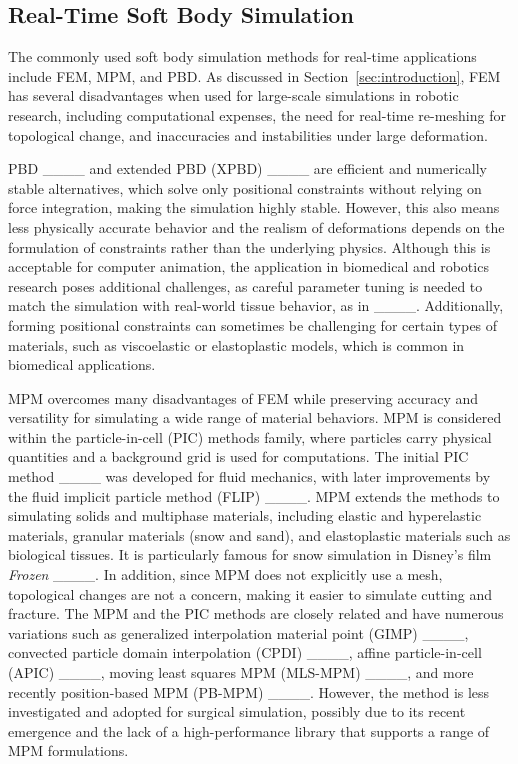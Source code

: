 \subsection{Real-Time Soft Body Simulation}
The commonly used soft body simulation methods for real-time applications include FEM, MPM, and PBD.
As discussed in Section~\ref{sec:introduction}, FEM has several disadvantages when used for large-scale simulations in robotic research, including computational expenses, the need for real-time re-meshing for topological change, and inaccuracies and instabilities under large deformation.

PBD ____ and extended PBD (XPBD) ____ are efficient and numerically stable alternatives, which solve only positional constraints without relying on force integration, making the simulation highly stable.
However, this also means less physically accurate behavior and the realism of deformations depends on the formulation of constraints rather than the underlying physics.
Although this is acceptable for computer animation, the application in biomedical and robotics research poses additional challenges, as careful parameter tuning is needed to match the simulation with real-world tissue behavior, as in ____.
Additionally, forming positional constraints can sometimes be challenging for certain types of materials, such as viscoelastic or elastoplastic models, which is common in biomedical applications.

MPM overcomes many disadvantages of FEM while preserving accuracy and versatility for simulating a wide range of material behaviors.
MPM is considered within the particle-in-cell (PIC) methods family, where particles carry physical quantities and a background grid is used for computations.
The initial PIC method ____ was developed for fluid mechanics, with later improvements by the fluid implicit particle method (FLIP) ____.
MPM extends the methods to simulating solids and multiphase materials, including elastic and hyperelastic materials, granular materials (\eg snow and sand), and elastoplastic materials such as biological tissues.
It is particularly famous for snow simulation in Disney's film \textit{Frozen} ____.
In addition, since MPM does not explicitly use a mesh, topological changes are not a concern, making it easier to simulate cutting and fracture.
The MPM and the PIC methods are closely related and have numerous variations such as generalized interpolation material point (GIMP) ____, convected particle domain interpolation (CPDI) ____, affine particle-in-cell (APIC) ____, moving least squares MPM (MLS-MPM) ____, and more recently position-based MPM (PB-MPM) ____.
However, the method is less investigated and adopted for surgical simulation, possibly due to its recent emergence and the lack of a high-performance library that supports a range of MPM formulations.